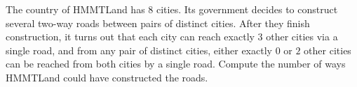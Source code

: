 The country of HMMTLand has $8$ cities. Its government decides to construct several two-way roads between pairs of distinct cities. After they finish construction, it turns out that each city can reach exactly $3$ other cities via a single road, and from any pair of distinct cities, either exactly $0$ or $2$ other cities can be reached from both cities by a single road. Compute the number of ways HMMTLand could have constructed the roads.